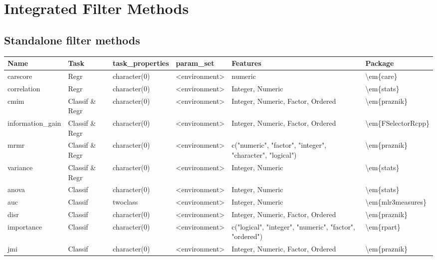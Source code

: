 \documentclass[]{scrbook}
\begin{document}
\hypertarget{list-filters}{%
\section{Integrated Filter Methods}\label{list-filters}}

\hypertarget{fs-filter-list}{%
\subsection{Standalone filter methods}\label{fs-filter-list}}

\begin{table}[H]
\centering\begingroup\fontsize{12}{14}\selectfont

\begin{tabular}{l|l|l|l|l|l}
\hline
Name & Task & task\_properties & param\_set & Features & Package\\
\hline
carscore & Regr & character(0) & <environment> & numeric & \textbackslash{}em\{care\}\\
\hline
correlation & Regr & character(0) & <environment> & Integer, Numeric & \textbackslash{}em\{stats\}\\
\hline
cmim & Classif \& Regr & character(0) & <environment> & Integer, Numeric, Factor, Ordered & \textbackslash{}em\{praznik\}\\
\hline
information\_gain & Classif \& Regr & character(0) & <environment> & Integer, Numeric, Factor, Ordered & \textbackslash{}em\{FSelectorRcpp\}\\
\hline
mrmr & Classif \& Regr & character(0) & <environment> & c("numeric", "factor", "integer", "character", "logical") & \textbackslash{}em\{praznik\}\\
\hline
variance & Classif \& Regr & character(0) & <environment> & Integer, Numeric & \textbackslash{}em\{stats\}\\
\hline
anova & Classif & character(0) & <environment> & Integer, Numeric & \textbackslash{}em\{stats\}\\
\hline
auc & Classif & twoclass & <environment> & Integer, Numeric & \textbackslash{}em\{mlr3measures\}\\
\hline
disr & Classif & character(0) & <environment> & Integer, Numeric, Factor, Ordered & \textbackslash{}em\{praznik\}\\
\hline
importance & Classif & character(0) & <environment> & c("logical", "integer", "numeric", "factor", "ordered") & \textbackslash{}em\{rpart\}\\
\hline
jmi & Classif & character(0) & <environment> & Integer, Numeric, Factor, Ordered & \textbackslash{}em\{praznik\}\\

\end{tabular}
\end{table}
\end{document}
